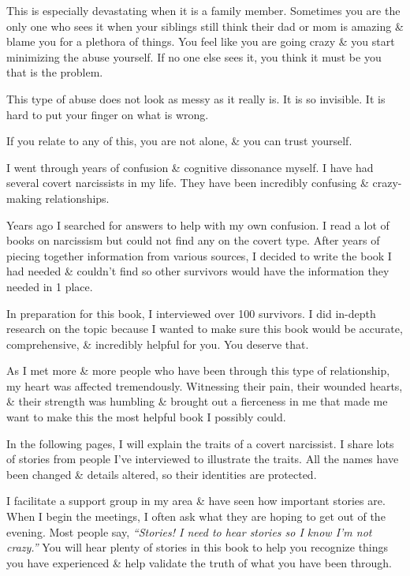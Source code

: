 \documentclass{article}
\numberwithin{equation}{section}
\begin{document}
This is especially devastating when it is a family member. Sometimes you are the only one who sees it when your siblings still think their dad or mom is amazing \& blame you for a plethora of things. You feel like you are going crazy \& you start minimizing the abuse yourself. If no one else sees it, you think it must be you that is the problem.

This type of abuse does not look as messy as it really is. It is so invisible. It is hard to put your finger on what is wrong.

If you relate to any of this, you are not alone, \& you can trust yourself.

I went through years of confusion \& cognitive dissonance myself. I have had several covert narcissists in my life. They have been incredibly confusing \& crazy-making relationships.

Years ago I searched for answers to help with my own confusion. I read a lot of books on narcissism but could not find any on the covert type. After years of piecing together information from various sources, I decided to write the book I had needed \& couldn't find so other survivors would have the information they needed in 1 place.

In preparation for this book, I interviewed over 100 survivors. I did in-depth research on the topic because I wanted to make sure this book would be accurate, comprehensive, \& incredibly helpful for you. You deserve that.

As I met more \& more people who have been through this type of relationship, my heart was affected tremendously. Witnessing their pain, their wounded hearts, \& their strength was humbling \& brought out a fierceness in me that made me want to make this the most helpful book I possibly could.

In the following pages, I will explain the traits of a covert narcissist. I share lots of stories from people I've interviewed to illustrate the traits. All the names have been changed \& details altered, so their identities are protected.

I facilitate a support group in my area \& have seen how important stories are. When I begin the meetings, I often ask what they are hoping to get out of the evening. Most people say, \textit{``Stories! I need to hear stories so I know I'm not crazy.''} You will hear plenty of stories in this book to help you recognize things you have experienced \& help validate the truth of what you have been through.
\end{document}
